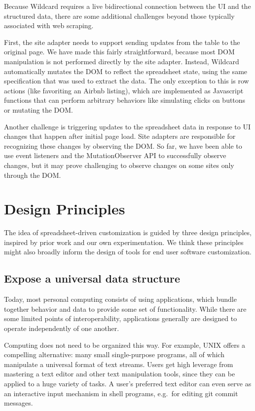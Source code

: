 \documentclass[english,submission]{programming}
\begin{document}
Because Wildcard requires a live bidirectional connection between the UI
and the structured data, there are some additional challenges beyond
those typically associated with web scraping.

First, the site adapter needs to support sending updates from the table
to the original page. We have made this fairly straightforward, because
most DOM manipulation is not performed directly by the site adapter.
Instead, Wildcard automatically mutates the DOM to reflect the
spreadsheet state, using the same specification that was used to extract
the data. The only exception to this is row actions (like favoriting an
Airbnb listing), which are implemented as Javascript functions that can
perform arbitrary behaviors like simulating clicks on buttons or
mutating the DOM.

Another challenge is triggering updates to the spreadsheet data in
response to UI changes that happen after initial page load. Site
adapters are responsible for recognizing these changes by observing the
DOM. So far, we have been able to use event listeners and the
MutationObserver API to successfully observe changes, but it may prove
challenging to observe changes on some sites only through the DOM.

\hypertarget{sec:design-principles}{%
\section{Design Principles}\label{sec:design-principles}}

The idea of spreadsheet-driven customization is guided by three design
principles, inspired by prior work and our own experimentation. We think
these principles might also broadly inform the design of tools for end
user software customization.

\hypertarget{expose-a-universal-data-structure}{%
\subsection{Expose a universal data
structure}\label{expose-a-universal-data-structure}}

Today, most personal computing consists of using applications, which
bundle together behavior and data to provide some set of functionality.
While there are some limited points of interoperability, applications
generally are designed to operate independently of one another.

Computing does not need to be organized this way. For example, UNIX
offers a compelling alternative: many small single-purpose programs, all
of which manipulate a universal format of text streams. Users get high
leverage from mastering a text editor and other text manipulation tools,
since they can be applied to a huge variety of tasks. A user's preferred
text editor can even serve as an interactive input mechanism in shell
programs, e.g.~for editing git commit messages.
\end{document}
